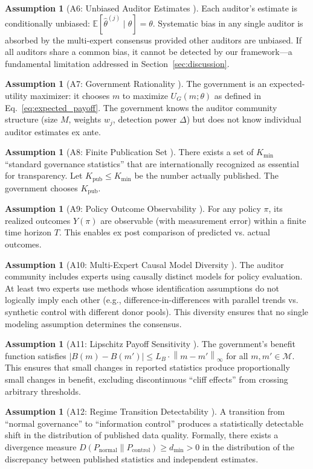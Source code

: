 \documentclass[11pt,a4paper]{article}
\theoremstyle{definition}
\newtheorem{assumption}[theorem]{Assumption}
\newcommand{\E}{\mathbb{E}}
\newcommand{\norm}[1]{\left\lVert#1\right\rVert}
\newcommand{\claimSpace}{\mathcal{M}}
\begin{document}
\begin{assumption}[A6: Unbiased Auditor Estimates ]
\label{ass:A6}
Each auditor's estimate is conditionally unbiased: $\E[\hat{\theta}^{(j)} \mid \theta] = \theta$. Systematic bias in any single auditor is absorbed by the multi-expert consensus provided other auditors are unbiased. If all auditors share a common bias, it cannot be detected by our framework---a fundamental limitation addressed in Section~\ref{sec:discussion}.
\end{assumption}
\begin{assumption}[A7: Government Rationality ]
\label{ass:A7}
The government is an expected-utility maximizer: it chooses $m$ to maximize $U_G(m; \theta)$ as defined in Eq.~\eqref{eq:expected_payoff}. The government knows the auditor community structure (size $M$, weights $w_j$, detection power $\Delta$) but does not know individual auditor estimates ex ante.
\end{assumption}
\begin{assumption}[A8: Finite Publication Set ]
\label{ass:A8}
There exists a set of $K_{\min}$ ``standard governance statistics'' that are internationally recognized as essential for transparency. Let $K_{\mathrm{pub}} \leq K_{\min}$ be the number actually published. The government chooses $K_{\mathrm{pub}}$.
\end{assumption}
\begin{assumption}[A9: Policy Outcome Observability ]
\label{ass:A9}
For any policy $\pi$, its realized outcomes $Y(\pi)$ are observable (with measurement error) within a finite time horizon $T$. This enables ex post comparison of predicted vs. actual outcomes.
\end{assumption}
\begin{assumption}[A10: Multi-Expert Causal Model Diversity ]
\label{ass:A10}
The auditor community includes experts using causally distinct models for policy evaluation. At least two experts use methods whose identification assumptions do not logically imply each other (e.g., difference-in-differences with parallel trends vs. synthetic control with different donor pools). This diversity ensures that no single modeling assumption determines the consensus.
\end{assumption}
\begin{assumption}[A11: Lipschitz Payoff Sensitivity ]
\label{ass:A11}
The government's benefit function satisfies $|B(m) - B(m')| \leq L_B \cdot \norm{m - m'}_\infty$ for all $m, m' \in \claimSpace$. This ensures that small changes in reported statistics produce proportionally small changes in benefit, excluding discontinuous ``cliff effects'' from crossing arbitrary thresholds.
\end{assumption}
\begin{assumption}[A12: Regime Transition Detectability ]
\label{ass:A12}
A transition from ``normal governance'' to ``information control'' produces a statistically detectable shift in the distribution of published data quality. Formally, there exists a divergence measure $D(P_{\mathrm{normal}} \| P_{\mathrm{control}}) \geq d_{\min} > 0$ in the distribution of the discrepancy between published statistics and independent estimates.
\end{assumption}
\end{document}
